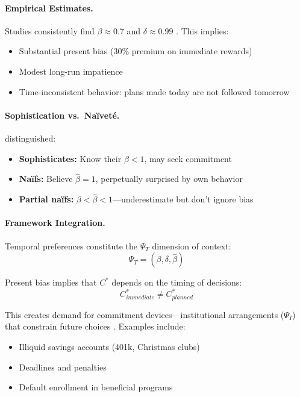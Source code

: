 \paragraph{Empirical Estimates.}
Studies consistently find $\beta \approx 0.7$ and $\delta \approx 0.99$
\citep{frederick2002time,cohen2020measuring}. This implies:
\begin{itemize}
  \item Substantial present bias (30\% premium on immediate rewards)
  \item Modest long-run impatience
  \item Time-inconsistent behavior: plans made today are not followed tomorrow
\end{itemize}

\paragraph{Sophistication vs.\ Naïveté.}
\citet{PAP-odonoghue1999doing,odonoghue2001} distinguished:
\begin{itemize}
  \item \textbf{Sophisticates:} Know their $\beta < 1$, may seek commitment
  \item \textbf{Naïfs:} Believe $\hat{\beta} = 1$, perpetually surprised by own behavior
  \item \textbf{Partial naïfs:} $\beta < \hat{\beta} < 1$---underestimate but don't ignore bias
\end{itemize}

\paragraph{Framework Integration.}
Temporal preferences constitute the $\Psi_T$ dimension of context:
\begin{equation}
  \Psi_T = (\beta, \delta, \hat{\beta})
\end{equation}

Present bias implies that $C^*$ depends on the timing of decisions:
\begin{equation}
  C^*_{immediate} \neq C^*_{planned}
\end{equation}

This creates demand for commitment devices---institutional arrangements ($\Psi_I$)
that constrain future choices \citep{ashraf2006,bryan2010}. Examples include:
\begin{itemize}
  \item Illiquid savings accounts (401k, Christmas clubs)
  \item Deadlines and penalties
  \item Default enrollment in beneficial programs \citep{madrian2001}
\end{itemize}

